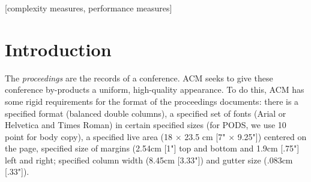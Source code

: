 \documentclass{sig-alternate2-pods09}
\begin{document}
%
\maketitle
\begin{abstract}
In this paper, we describe the formatting guidelines for PODS 2009
submissions. The format is modified from the ACM SIG Proceedings
format, with the only change being that the text font size is
increased to 10 points from 9 points.  Note that accepted papers
will need to change to the ACM format with 9 points for the
proceedings.

This paper provides a sample of a \LaTeX\ document which conforms to
the formatting guidelines for ACM SIG Proceedings. It complements
the document \textit{Author's Guide to Preparing ACM SIG Proceedings
Using \LaTeX$2_\epsilon$\ and Bib\TeX}. This source file has been
written with the intention of being compiled under
\LaTeX$2_\epsilon$\ and BibTeX.

The developers have tried to include every imaginable sort
of ``bells and whistles", such as a subtitle, footnotes on
title, subtitle and authors, as well as in the text, and
every optional component (e.g. Acknowledgments, Additional
Authors, Appendices), not to mention examples of
equations, theorems, tables and figures.

To make best use of this sample document, run it through \LaTeX\
and BibTeX, and compare this source code with the printed
output produced by the dvi file.
\end{abstract}

[complexity measures, performance measures]



\section{Introduction}
The \textit{proceedings} are the records of a conference. ACM seeks
to give these conference by-products a uniform, high-quality
appearance.  To do this, ACM has some rigid requirements for the
format of the proceedings documents: there is a specified format
(balanced  double columns), a specified set of fonts (Arial or
Helvetica and Times Roman) in certain specified sizes (for PODS, we
use 10 point for body copy), a specified live area (18 $\times$ 23.5
cm [7" $\times$ 9.25"]) centered on the page, specified size of
margins (2.54cm [1"] top and bottom and 1.9cm [.75"] left and right;
specified column width (8.45cm [3.33"]) and gutter size (.083cm
[.33"]).
\end{document}
